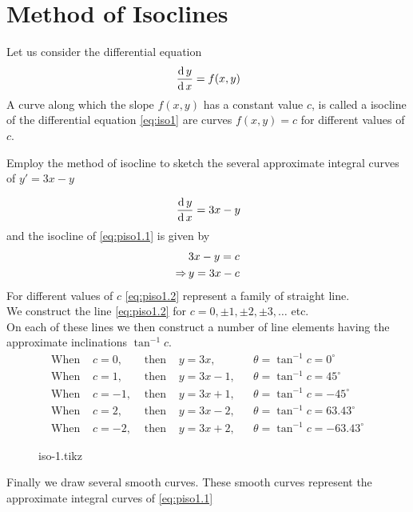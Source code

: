 \documentclass[../main-sheet.tex]{subfiles}
\begin{document}
\section{Method of Isoclines}
Let us consider the differential equation
\begin{equation}
    \,\frac{\mathrm{d}\,y}{\mathrm{d}\,x}=f(x,y) \label{eq:iso1}
\end{equation}
A curve along which the slope \(f(x,y)\) has a constant value \(c\), is called a isocline of the differential equation \eqref{eq:iso1} are curves \(f(x,y)=c\) for different values of \(c\).
\begin{prob}
    Employ the method of isocline to sketch the several approximate integral curves of \(y'=3x-y\)
\end{prob}
\begin{soln}
    \begin{equation}
        \,\frac{\mathrm{d}\,y}{\mathrm{d}\,x}=3x-y\label{eq:piso1.1}
    \end{equation}
    and the isocline of \eqref{eq:piso1.1} is given by 
    \begin{align}
        &3x-y=c\notag\\
        \Rightarrow\,&y=3x-c\label{eq:piso1.2}
    \end{align}
    For different values of \(c\) \eqref{eq:piso1.2} represent a family of straight line.\\
    We construct the line \eqref{eq:piso1.2} for \(c=0,\pm1,\pm2,\pm3,\dots\) etc.\\
    On each of these lines we then construct a number of line elements having the approximate inclinations \(\tan^{-1}c\).
    \begin{align*}
        \text{When } & c=0,  & \text{ then } & y=3x,   &&\theta=\tan^{-1}c=0^{\circ}\\
        \text{When } & c=1,  & \text{ then } & y=3x-1, &&\theta=\tan^{-1}c=45^{\circ}\\
        \text{When } & c=-1, & \text{ then } & y=3x+1, &&\theta=\tan^{-1}c=-45^{\circ}\\
        \text{When } & c=2,  & \text{ then } & y=3x-2, &&\theta=\tan^{-1}c=63.43^{\circ}\\
        \text{When } & c=-2, & \text{ then } & y=3x+2, &&\theta=\tan^{-1}c=-63.43^{\circ}
    \end{align*}
    \begin{figure}[H]
        \centering
        {iso-1.tikz}
    \end{figure}
    Finally we draw several smooth curves. These smooth curves represent the approximate integral curves of \eqref{eq:piso1.1}
\end{soln}
\end{document}
